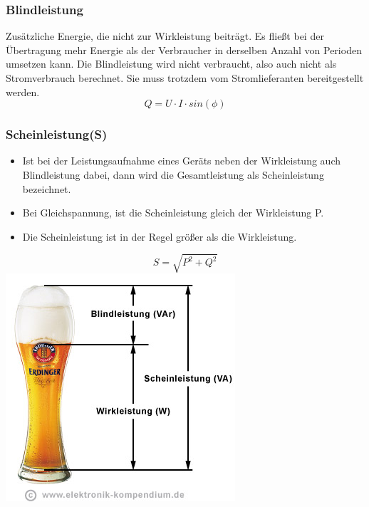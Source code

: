 \documentclass[10pt,a4paper]{article}
\begin{document}
\subsubsection{Blindleistung}
Zusätzliche Energie, die nicht zur Wirkleistung beiträgt. Es fließt bei der Übertragung mehr Energie als der Verbraucher in derselben Anzahl von Perioden umsetzen kann. Die Blindleistung wird nicht verbraucht, also auch nicht als Stromverbrauch berechnet. Sie muss trotzdem vom Stromlieferanten bereitgestellt werden.
\begin{equation}
Q=U \cdot I \cdot sin(\phi)
\end{equation}
\subsubsection{Scheinleistung(S)}
\begin{itemize}
\item Ist bei der Leistungsaufnahme eines Geräts neben der Wirkleistung auch Blindleistung dabei, dann wird die Gesamtleistung als Scheinleistung bezeichnet.
\item Bei Gleichspannung, ist die Scheinleistung gleich der Wirkleistung P. 
\item Die Scheinleistung ist in der Regel größer als die Wirkleistung.
\end{itemize}
\begin{equation}
S=\sqrt{P^2+Q^2}
\end{equation}
\includegraphics[scale=0.5]{beer.png}\centering 
\end{document}
